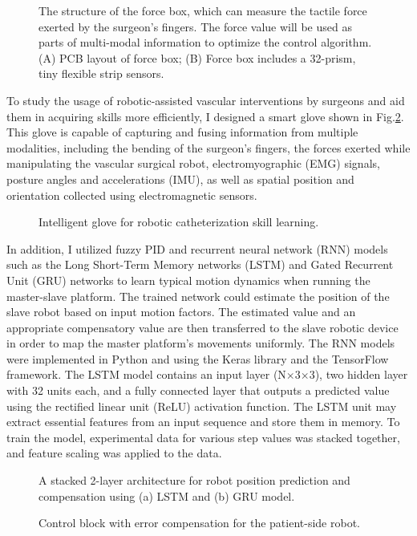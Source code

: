 \documentclass[
    ngerman,american
    ]{scrartcl}
\begin{document}
\begin{figure}[H]
	\caption{The structure of the force box, which can measure the tactile force exerted by the surgeon's fingers. The force value will be used as parts of multi-modal information to optimize the control algorithm. (A) PCB layout of force box; (B) Force box includes a 32-prism,  tiny flexible strip sensors. }
	\label{forcebox}
\end{figure}   


To study the usage of robotic-assisted vascular interventions by surgeons and aid them in acquiring skills more efficiently, I designed a smart glove shown in Fig.\ref{glove}. This glove is capable of capturing and fusing information from multiple modalities, including the bending of the surgeon's fingers, the forces exerted while manipulating the vascular surgical robot, electromyographic (EMG) signals, posture angles and accelerations (IMU), as well as spatial position and orientation collected using electromagnetic sensors.


\begin{figure}[H]
	\caption{Intelligent glove for robotic catheterization skill learning. }
	\label{glove}
\end{figure}   


In addition, I utilized fuzzy PID and recurrent neural network (RNN) models such as the Long Short-Term Memory networks (LSTM) and Gated Recurrent Unit (GRU) networks to learn typical motion dynamics when running the master-slave platform. The trained network could estimate the position of the slave robot based on input motion factors. The estimated value and an appropriate compensatory value are then transferred to the slave robotic device in order to map the master platform's movements uniformly.     
The RNN models were implemented in Python and using the Keras library and the TensorFlow framework. The LSTM model contains an input layer (N$\times$3$\times$3), two hidden layer with 32 units each, and a fully connected layer that outputs a predicted value using the rectified linear unit (ReLU) activation function. The LSTM unit may extract essential features from an input sequence and store them in memory. To train the model, experimental data for various step values was stacked together, and feature scaling was applied to the data. 


\begin{figure}[H]
	\caption{A stacked 2-layer architecture for robot position prediction and compensation using (a) LSTM and (b) GRU model.}
	\label{LSTM_GRU}
\end{figure}   
%
\begin{figure}[H]
	
	\caption{Control block with error compensation for the patient-side robot.}
	\label{control_block}
\end{figure}   
\end{document}
